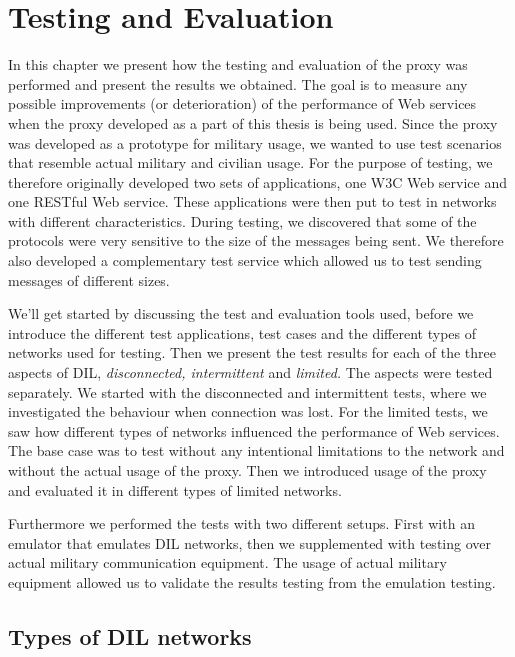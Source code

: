 \chapter{Testing and Evaluation}

\label{chapter:evaluation}

In this chapter we present how the testing and evaluation of the proxy was
performed and present the results we obtained.  The goal is to measure any
possible improvements (or deterioration) of the performance of Web services when
the proxy developed as a part of this thesis is being used. Since the proxy was
developed as a prototype for military usage, we wanted to use test scenarios
that resemble actual military and civilian usage. For the purpose of testing,
we therefore originally developed two sets of applications, one W3C Web service
and one RESTful Web service. These applications were then put to test in
networks with different characteristics. During testing, we discovered that some
of the protocols were very sensitive to the size of the messages being sent. We
therefore also developed a complementary test service which allowed us to test
sending messages of different sizes.

We'll get started by discussing the test and evaluation tools used, before we
introduce the different test applications, test cases and the different types
of networks used for testing. Then we present the test results for each of the
three aspects of DIL, \textit{disconnected, intermittent} and
\textit{limited.} The aspects were tested separately. We started with the
disconnected and intermittent tests, where we investigated the behaviour when
connection was lost. For the limited tests, we saw how different types of
networks influenced the performance of Web services. The base case was to
test without any intentional limitations to the network and without the actual
usage of the proxy. Then we introduced usage of the proxy and evaluated it in
different types of limited networks.

Furthermore we performed the tests with two different setups. First with an
emulator that emulates DIL networks, then we supplemented with testing over
actual military communication equipment. The usage of actual military equipment
allowed us to validate the results testing from the emulation testing.

\section{Types of DIL networks}

